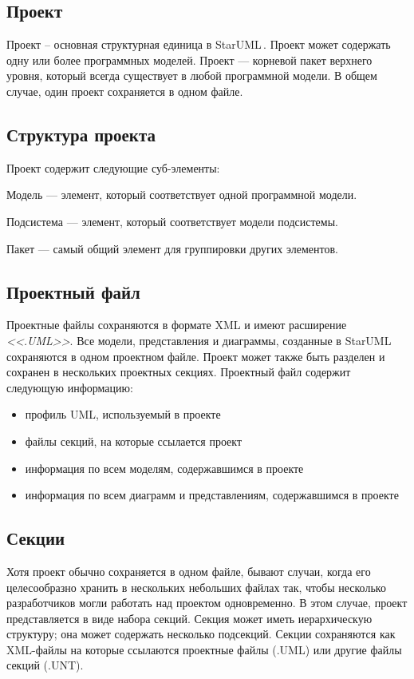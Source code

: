 \documentclass[a4paper,12pt]{extreport}
\newcommand{\staruml}{StarUML\,\tm}
\begin{document}
\subsection*{Проект}
Проект -- основная структурная единица в \staruml.
Проект может содержать одну или более программных моделей. Проект --- корневой пакет
верхнего уровня, который всегда существует в любой программной модели. В общем случае, один
проект сохраняется в одном файле.

\subsection*{Структура проекта}
Проект содержит следующие суб-элементы:

Модель --- элемент, который соответствует одной программной модели.

Подсистема --- элемент, который соответствует модели подсистемы.

Пакет --- самый общий элемент для группировки других элементов.

\subsection*{Проектный файл}Проектные файлы сохраняются в формате XML и имеют расширение \textit{<<.UML>>}. Все модели,
представления и диаграммы, созданные в \staruml сохраняются в одном проектном файле.
Проект может также быть разделен и сохранен в нескольких проектных секциях. Проектный файл
содержит следующую информацию:
\begin{itemize}
	\item профиль UML, используемый в проекте
	\item файлы секций, на которые ссылается проект
	\item информация по всем моделям, содержавшимся в проекте
	\item информация по всем диаграмм и представлениям, содержавшимся в проекте
\end{itemize}


\subsection*{Секции}
Хотя проект обычно сохраняется в одном файле, бывают случаи, когда его целесообразно
хранить в нескольких небольших файлах так, чтобы несколько разработчиков могли работать над
проектом одновременно. В этом случае, проект представляется в виде набора секций. Секция
может иметь иерархическую структуру; она может содержать несколько подсекций. Секции
сохраняются как XML-файлы на которые ссылаются проектные файлы (.UML) или другие файлы
секций (.UNT).
\end{document}
